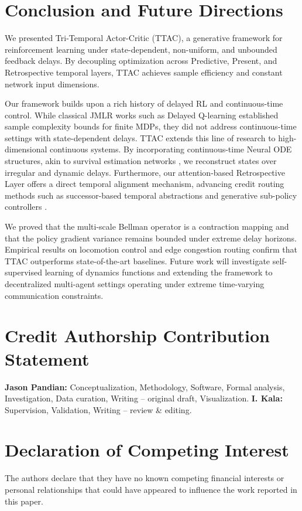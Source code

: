 \documentclass[manuscript, screen, review]{jair}
\begin{document}
\section{Conclusion and Future Directions}\label{sec:conclusion}
We presented Tri-Temporal Actor-Critic (TTAC), a generative framework for reinforcement learning under state-dependent, non-uniform, and unbounded feedback delays. By decoupling optimization across Predictive, Present, and Retrospective temporal layers, TTAC achieves sample efficiency and constant network input dimensions. 

Our framework builds upon a rich history of delayed RL and continuous-time control. While classical JMLR works such as Delayed Q-learning \citep{strehl2009reinforcement} established sample complexity bounds for finite MDPs, they did not address continuous-time settings with state-dependent delays. TTAC extends this line of research to high-dimensional continuous systems. By incorporating continuous-time Neural ODE structures, akin to survival estimation networks \citep{tang2022soden}, we reconstruct states over irregular and dynamic delays. Furthermore, our attention-based Retrospective Layer offers a direct temporal alignment mechanism, advancing credit routing methods such as successor-based temporal abstractions \citep{machado2023temporal} and generative sub-policy controllers \citep{ghadirzadeh2022training}.

We proved that the multi-scale Bellman operator is a contraction mapping and that the policy gradient variance remains bounded under extreme delay horizons. Empirical results on locomotion control and edge congestion routing confirm that TTAC outperforms state-of-the-art baselines. Future work will investigate self-supervised learning of dynamics functions and extending the framework to decentralized multi-agent settings operating under extreme time-varying communication constraints.

\section*{Credit Authorship Contribution Statement}
\textbf{Jason Pandian:} Conceptualization, Methodology, Software, Formal analysis, Investigation, Data curation, Writing -- original draft, Visualization. \textbf{I. Kala:} Supervision, Validation, Writing -- review \& editing.

\section*{Declaration of Competing Interest}
The authors declare that they have no known competing financial interests or personal relationships that could have appeared to influence the work reported in this paper.
\end{document}
